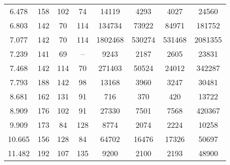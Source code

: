 \begin{table}[htbp]
\begin{tabular}{S[table-format=2.3]S[table-format=3.0]S[table-format=3.0]S[table-format=3.0]S[table-format=7.0]S[table-format=7.0]S[table-format=7.0]S[table-format=7.0]}
		6.478                 & 158                   & 102                    & 74                     & 14119                     & 4293                     & 4027                     & 24560                    \\
		6.803                 & 142                   & 70                     & 114                    & 134734                    & 73922                    & 84971                    & 181752                   \\
		7.077                 & 142                   & 70                     & 114                    & 1802468                   & 530274                   & 531468                   & 2081355                  \\
		7.239                 & 141                   & 69                     & {--}                   & 9243                      & 2187                     & 2605                     & 23831                    \\
		7.468                 & 142                   & 114                    & 70                     & 271403                    & 50524                    & 24012                    & 342287                   \\
		7.793                 & 188                   & 142                    & 98                     & 13168                     & 3960                     & 3247                     & 30481                    \\
		8.681                 & 162                   & 131                    & 91                     & 716                       & 370                      & 420                      & 13722                    \\
		8.909                 & 176                   & 102                    & 91                     & 27330                     & 7501                     & 7568                     & 420367                   \\
		9.909                 & 173                   & 84                     & 128                    & 8774                      & 2074                     & 2224                     & 10258                    \\
		10.665                & 156                   & 128                    & 84                     & 64702                     & 16476                    & 17326                    & 50697                    \\
		11.482                & 192                   & 107                    & 135                    & 9200                      & 2100                     & 2193                     & 48900                    \\\bottomrule
	\end{tabular}
	\label{tab:area}
\end{table}
